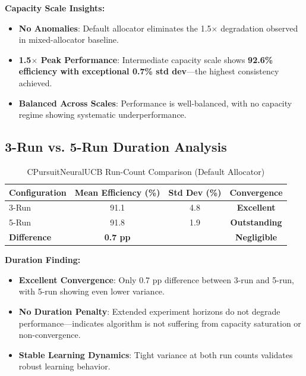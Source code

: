 \documentclass[12pt,a4paper]{article}
\newcommand{\success}[1]{\textcolor{accentgreen}{\textbf{#1}}}
\begin{document}
\textbf{Capacity Scale Insights:}

\begin{itemize}
    \item \success{No Anomalies}: Default allocator eliminates the 1.5$\times$ degradation observed in mixed-allocator baseline.
    
    \item \success{1.5$\times$ Peak Performance}: Intermediate capacity scale shows \success{92.6\% efficiency with exceptional 0.7\% std dev}---the highest consistency achieved.
    
    \item \success{Balanced Across Scales}: Performance is well-balanced, with no capacity regime showing systematic underperformance.
\end{itemize}

\subsection{3-Run vs. 5-Run Duration Analysis}

\begin{table}[H]
\centering
\caption{CPursuitNeuralUCB Run-Count Comparison (Default Allocator)}
\begin{tabular}{@{}lccc@{}}
\toprule
\textbf{Configuration} & \textbf{Mean Efficiency (\%)} & \textbf{Std Dev (\%)} & \textbf{Convergence} \\
\midrule
3-Run & 91.1 & 4.8 & \success{Excellent} \\
5-Run & 91.8 & 1.9 & \success{Outstanding} \\
\textbf{Difference} & \textbf{0.7 pp} & \text{---} & \textbf{Negligible} \\
\bottomrule
\end{tabular}
\end{table}

\textbf{Duration Finding:}

\begin{itemize}
    \item \success{Excellent Convergence}: Only 0.7 pp difference between 3-run and 5-run, with 5-run showing even lower variance.
    
    \item \success{No Duration Penalty}: Extended experiment horizons do not degrade performance---indicates algorithm is not suffering from capacity saturation or non-convergence.
    
    \item \success{Stable Learning Dynamics}: Tight variance at both run counts validates robust learning behavior.
\end{itemize}
\end{document}
